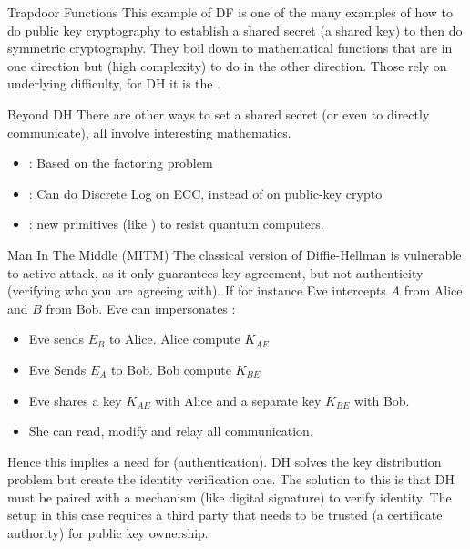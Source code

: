 \begin{parag}{Trapdoor Functions}
    This example of DF is one of the many examples of how to do public key cryptography to establish a shared secret (a shared key) to then do symmetric cryptography. They boil down to mathematical functions that are  in one direction but  (high complexity) to do in the other direction. Those rely on underlying difficulty, for DH it is the .
\end{parag}
\begin{parag}{Beyond DH}
    There are other ways to set a shared secret (or even to directly communicate), all involve interesting mathematics.
	\begin{itemize}
	    \item {}: Based on the factoring problem
	    \item {}: Can do Discrete Log on ECC, instead of on public-key crypto
	    \item {}: new primitives (like ) to resist quantum computers.
	\end{itemize}
\end{parag}
\begin{parag}{Man In The Middle (MITM)}
    The classical version of Diffie-Hellman is vulnerable to active attack, as it only guarantees key agreement, but not authenticity (verifying who you are agreeing with). If for instance Eve intercepts $A$ from Alice and $B$ from Bob. Eve can impersonates : 
	\begin{itemize}
	    \item Eve sends $E_B$ to Alice. Alice compute $K_{AE}$
	    \item Eve Sends $E_A$ to Bob. Bob compute $K_{BE}$
	    \item Eve shares a key $K_{AE}$ with Alice and a separate key $K_{BE}$ with Bob.
	    \item She can read, modify and relay all communication.
	\end{itemize}
	Hence this implies a need for  (authentication). DH solves the key distribution problem but create the identity verification one. The solution to this is that DH must be paired with a mechanism (like digital signature) to verify identity. The setup in this case requires a third party that needs to be trusted (a certificate authority) for public key ownership.
\end{parag}





















